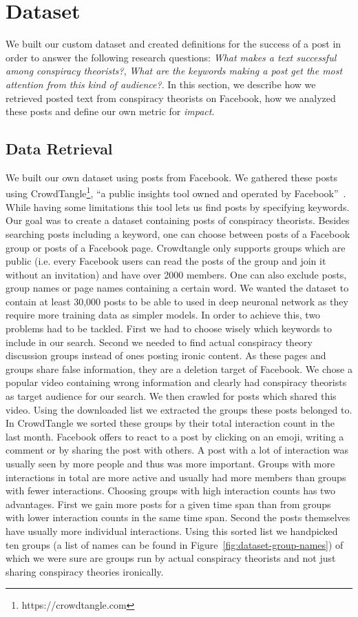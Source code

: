 \section{Dataset}
\label{sec:dataset}
We built our custom dataset and created  definitions for the success of a post in order to
answer the following research questions: \emph{What makes a text successful  among
conspiracy theorists?}, \emph{What are the keywords making a post get the most  attention
from this kind of audience?}.  In this section, we describe how we retrieved posted  text
from conspiracy theorists on Facebook, how we analyzed these posts and define our own 
metric for \emph{impact}.

\subsection{Data Retrieval}
We built our own dataset using posts from Facebook. We gathered these posts using 
CrowdTangle\footnote{https://crowdtangle.com}, ``a public insights tool owned and operated
by Facebook''~\citep{ctshiffmanciting}. While having some limitations this tool lets us 
find posts by specifying keywords. Our goal was to create a dataset containing posts of 
conspiracy theorists. Besides searching posts including a keyword, one can choose between
posts of a Facebook group or posts of a Facebook page. Crowdtangle only supports groups
which are public (i.e. every Facebook  users can read the posts of the group and join it
without an invitation) and have over 2000 members. One can also exclude posts, group names
or page names containing a certain word. We wanted the dataset to contain at least 30,000 posts to be able to used in deep neuronal network as they require more training
data as simpler models. In order to achieve this, two problems had to be tackled. First we
had to choose wisely which keywords to include in our search. Second we needed to find
actual conspiracy theory discussion groups instead of ones posting ironic content. As these
pages and groups share false information, they are a deletion target of Facebook. We
chose a popular video containing wrong information and clearly had conspiracy
theorists as target audience for our search. We then crawled for posts which shared this video.
Using the downloaded list we extracted the groups these posts belonged to. In CrowdTangle we
sorted these groups by their total interaction count in the last month.  Facebook offers
 to react to a post by clicking on an emoji, writing a comment or by sharing the post 
with others. A post  with a lot of
interaction was usually seen by more people and thus was more important. Groups with more
interactions in total are more active and usually had more members than groups with fewer
interactions. Choosing groups with high interaction counts has two advantages. First we
gain more posts for a given time span than from groups with lower interaction counts in
the same time span. Second the posts themselves have usually more individual interactions.
Using this sorted list we handpicked ten groups (a list of names can be found in
Figure~\ref{fig:dataset-group-names}) of which we were sure are groups run by actual
conspiracy theorists and not just sharing conspiracy theories ironically. 

